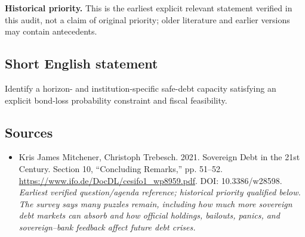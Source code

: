 \documentclass[11pt]{article}
\begin{document}
\par\textbf{Historical priority.} This is the earliest explicit relevant statement verified in this audit, not a claim of original priority; older literature and earlier versions may contain antecedents.

\subsection{Short English statement}
Identify a horizon- and institution-specific safe-debt capacity satisfying an explicit bond-loss probability constraint and fiscal feasibility.

\subsection{Sources}
\begin{itemize}\raggedright
\item[\textnormal{[S1]}]\hypertarget{source:30007535:1}{} Kris James Mitchener, Christoph Trebesch. 2021. Sovereign Debt in the 21st Century. Section 10, “Concluding Remarks,” pp. 51–52.
\url{https://www.ifo.de/DocDL/cesifo1_wp8959.pdf}.
DOI: 10.3386/w28598.
{\small\textit{Earliest verified question/agenda reference; historical priority qualified below. The survey says many puzzles remain, including how much more sovereign debt markets can absorb and how official holdings, bailouts, panics, and sovereign–bank feedback affect future debt crises.}}
\end{itemize}
\end{document}
